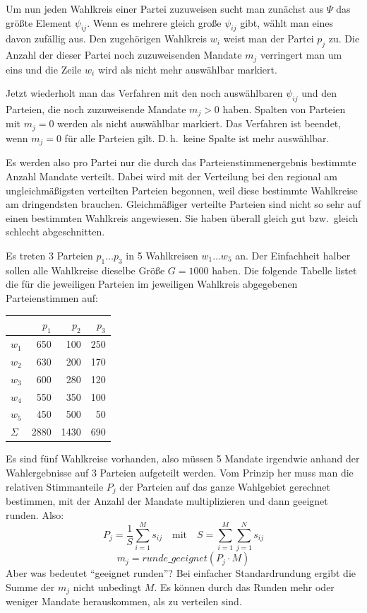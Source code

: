 Um nun jeden Wahlkreis einer Partei zuzuweisen sucht man zunächst aus $\Psi$ das größte Element
$\psi_{ij}$. Wenn es mehrere gleich große $\psi_{ij}$ gibt, wählt man eines davon zufällig aus.
Den zugehörigen Wahlkreis $w_i$ weist man der Partei $p_j$ zu. Die Anzahl der dieser Partei noch
zuzuweisenden Mandate $m_j$ verringert man um eins und die Zeile $w_i$ wird als nicht mehr
auswählbar markiert.

Jetzt wiederholt man das Verfahren mit den noch auswählbaren $\psi_{ij}$ und den Parteien, die
noch zuzuweisende Mandate $m_j > 0$ haben. Spalten von Parteien mit $m_j = 0$ werden als nicht
auswählbar markiert. Das Verfahren ist beendet, wenn $m_j = 0$ für alle Parteien gilt. D.\,h.\
keine Spalte ist mehr auswählbar.

Es werden also pro Partei nur die durch das Parteienstimmenergebnis bestimmte Anzahl Mandate
verteilt. Dabei wird mit der Verteilung bei den regional am ungleichmäßigsten verteilten Parteien
begonnen, weil diese bestimmte Wahlkreise am dringendsten brauchen.
Gleichmäßiger verteilte Parteien sind nicht so sehr auf einen bestimmten Wahlkreis angewiesen.
Sie haben überall gleich gut bzw.\ gleich schlecht abgeschnitten.


Es treten 3 Parteien $p_1 \ldots p_3$ in 5 Wahlkreisen $w_1 \ldots w_5$ an. Der Einfachheit
halber sollen alle Wahlkreise dieselbe Größe $G = 1000$ haben. Die folgende Tabelle listet die
für die jeweiligen Parteien im jeweiligen Wahlkreis abgegebenen Parteienstimmen auf:

\bigskip
\begin{center}
\begin{tabular}{l r r r}
  \toprule
           & $p_1$ & $p_2$ & $p_3$ \\
  \midrule
  $w_1$    & 650   & 100   & 250   \\
  $w_2$    & 630   & 200   & 170   \\
  $w_3$    & 600   & 280   & 120   \\
  $w_4$    & 550   & 350   & 100   \\
  $w_5$    & 450   & 500   & 50    \\
  \midrule
  $\Sigma$ & 2880  & 1430  & 690   \\
  \bottomrule
\end{tabular}
\end{center}
\bigskip

Es sind fünf Wahlkreise vorhanden, also müssen 5 Mandate irgendwie anhand der Wahlergebnisse auf
3 Parteien aufgeteilt werden. Vom Prinzip her muss man die relativen Stimmanteile $P_j$ der
Parteien auf das ganze Wahlgebiet gerechnet bestimmen, mit der Anzahl der Mandate multiplizieren
und dann geeignet runden. Also:
\[
  P_j = \frac{1}{S}\sum_{i=1}^{M} s_{ij}
  \quad \text{mit} \quad S = \sum_{i=1}^{M}\sum_{j=1}^{N} s_{ij}
\]
\[
  m_j = \textit{runde\_geeignet}(P_j \cdot M)
\]
Aber was bedeutet \enquote{geeignet runden}? Bei einfacher Standardrundung ergibt die Summe der
$m_j$ nicht unbedingt $M$. Es können durch das Runden mehr oder weniger Mandate herauskommen, als
zu verteilen sind.

